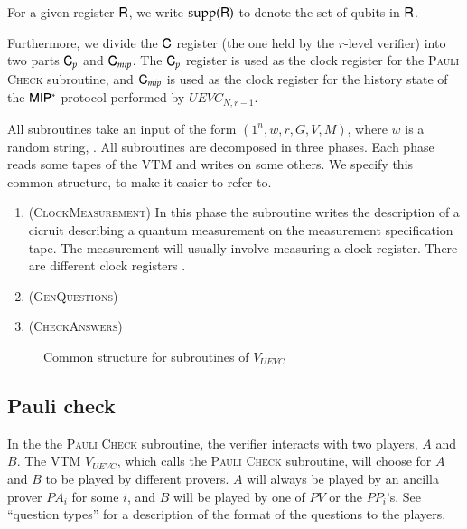 For a given register ${\mathsf{R}}$, we write $\operatorname{supp}({\mathsf{R}})$ to denote the set of qubits in ${\mathsf{R}}$.

Furthermore, we divide the ${\mathsf{C}}$ register (the one held by the $r$-level verifier) into two parts ${\mathsf{C}}_{p}$ and ${\mathsf{C}}_{mip}$. The ${\mathsf{C}}_{p}$ register is used as the clock register for the \textsc{Pauli Check} subroutine, and ${\mathsf{C}}_{mip}$ is used as the clock register for the history state of the ${\sf MIP^*}$ protocol performed by $UEVC_{N,r-1}$. 


\vspace{10pt}
\begin{center}
\begin{mdframed}
    All subroutines take an input of the form $(1^n,w,r,G,V,M)$, where $w$ is a random string, .
		All subroutines are decomposed in three phases. Each phase reads some tapes of the VTM and writes on some others. We specify this common structure, to make it easier to refer to. 
	\begin{enumerate}
		\item (\textsc{ClockMeasurement}) In this phase the subroutine writes the description of a cicruit describing a quantum measurement on the measurement specification tape. The measurement will usually involve measuring a clock register. There are different clock registers . 
	\item (\textsc{GenQuestions}) 
		\item (\textsc{CheckAnswers}) 
	\end{enumerate}    
\end{mdframed}

\end{center}
\begin{figure}[H]
\caption{Common structure for subroutines of $V_{UEVC}$}
\label{fig:prop_check}
\end{figure}






\subsection{Pauli check}
\label{sec:pauli_check}

	In the the \textsc{Pauli Check} subroutine, the verifier interacts with two players, $A$ and $B$. The VTM $V_{UEVC}$, which calls the \textsc{Pauli Check} subroutine, will choose for $A$ and $B$ to be played by different provers. $A$ will always be played by an ancilla prover $PA_i$ for some $i$, and $B$ will be played by one of $PV$ or the $PP_i$'s. See ``question types'' for a description of the format of the questions to the players.
		
